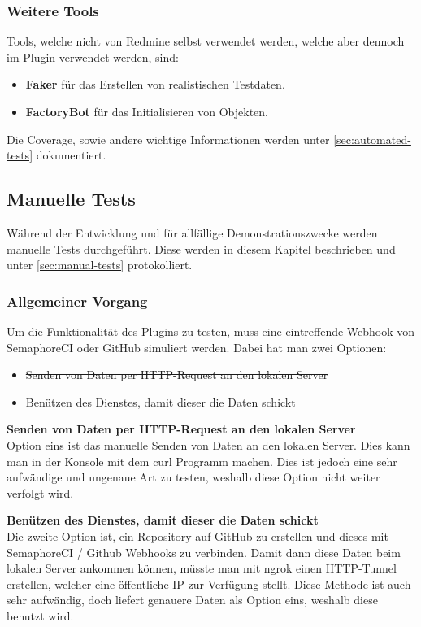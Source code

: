 \subsubsection{Weitere Tools}
Tools, welche nicht von Redmine selbst verwendet werden, welche aber dennoch im Plugin verwendet werden, sind:
\begin{itemize}
  \item \textbf{Faker} für das Erstellen von realistischen Testdaten.
  \item \textbf{FactoryBot} für das Initialisieren von Objekten.
\end{itemize}
Die Coverage, sowie andere wichtige Informationen werden unter \ref{sec:automated-tests} dokumentiert.

\subsection{Manuelle Tests}
\label{sec:manual-testing}
Während der Entwicklung und für allfällige Demonstrationszwecke werden manuelle Tests durchgeführt. Diese
werden in diesem Kapitel beschrieben und unter \ref{sec:manual-tests} protokolliert.

\subsubsection{Allgemeiner Vorgang}
\label{sec:general-testing}
Um die Funktionalität des Plugins zu testen, muss eine eintreffende Webhook von SemaphoreCI oder GitHub simuliert werden.
Dabei hat man zwei Optionen:
\begin{itemize}
  \item \st{Senden von Daten per HTTP-Request an den lokalen Server}
  \item Benützen des Dienstes, damit dieser die Daten schickt
\end{itemize}

\textbf{Senden von Daten per HTTP-Request an den lokalen Server} \\
Option eins ist das manuelle Senden von Daten an den lokalen Server. Dies kann man in der Konsole mit dem curl Programm
\cite{everything_curl} machen. Dies ist jedoch eine sehr aufwändige und ungenaue Art zu testen, weshalb diese Option nicht
weiter verfolgt wird. \newline

\textbf{Benützen des Dienstes, damit dieser die Daten schickt} \\
Die zweite Option ist, ein Repository auf GitHub zu erstellen und dieses mit SemaphoreCI / Github Webhooks zu
verbinden. \newline
Damit dann diese Daten beim lokalen Server ankommen können, müsste man mit ngrok \cite{ngrok_http_docs} einen HTTP-Tunnel
erstellen, welcher eine öffentliche IP zur Verfügung stellt. \newline
Diese Methode ist auch sehr aufwändig, doch liefert genauere Daten als Option eins, weshalb diese benutzt wird.

